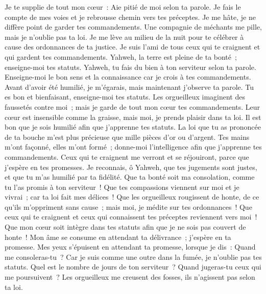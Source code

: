\begin{multicols}{2}
Je te supplie de tout mon cœur~: Aie pitié de moi selon ta parole.
Je fais le compte de mes voies et je rebrousse chemin vers tes préceptes.
Je me hâte, je ne diffère point de garder tes commandements.
Une compagnie de méchants me pille, mais je n'oublie pas ta loi.
Je me lève au milieu de la nuit pour te célébrer à cause des ordonnances de ta justice.
Je suis l'ami de tous ceux qui te craignent et qui gardent tes commandements.
Yahweh, la terre est pleine de ta bonté~; enseigne-moi tes statuts.
 Yahweh, tu fais du bien à ton serviteur selon ta parole.
Enseigne-moi le bon sens et la connaissance car je crois à tes commandements.
Avant d'avoir été humilié, je m'égarais, mais maintenant j'observe ta parole.
Tu es bon et bienfaisant, enseigne-moi tes statuts.
Les orgueilleux imaginent des faussetés contre moi~; mais je garde de tout mon cœur tes commandements.
Leur cœur est insensible comme la graisse, mais moi, je prends plaisir dans ta loi.
Il est bon que je sois humilié afin que j'apprenne tes statuts.
La loi que tu as prononcée de ta bouche m'est plus précieuse que mille pièces d'or ou d'argent.
 Tes mains m'ont façonné, elles m'ont formé~; donne-moi l'intelligence afin que j'apprenne tes commandements.
Ceux qui te craignent me verront et se réjouiront, parce que j'espère en tes promesses.
Je reconnais, ô Yahweh, que tes jugements sont justes, et que tu m'as humilié par ta fidélité.
Que ta bonté soit ma consolation, comme tu l'as promis à ton serviteur~!
Que tes compassions viennent sur moi et je vivrai~; car ta loi fait mes délices~!
Que les orgueilleux rougissent de honte, de ce qu'ils m'oppriment sans cause~; mais moi, je médite sur tes ordonnances~!
Que ceux qui te craignent et ceux qui connaissent tes préceptes reviennent vers moi~!
Que mon cœur soit intègre dans tes statuts afin que je ne sois pas couvert de honte~!
 Mon âme se consume en attendant ta délivrance~; j'espère en ta promesse.
Mes yeux s'épuisent en attendant ta promesse, lorsque je dis~: Quand me consoleras-tu~?
Car je suis comme une outre dans la fumée, je n'oublie pas tes statuts.
Quel est le nombre de jours de ton serviteur~? Quand jugeras-tu ceux qui me poursuivent~?
Les orgueilleux me creusent des fosses, ils n'agissent pas selon ta loi.

\end{multicols}
